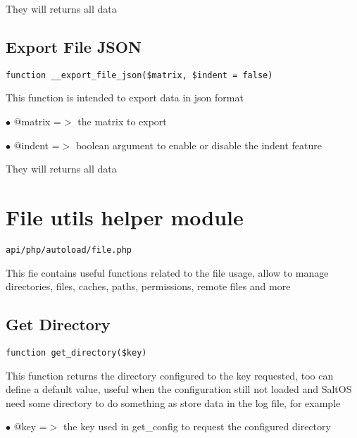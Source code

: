 \documentclass[a4paper]{book}
\begin{document}
They will returns all data

\hypertarget{toc126}{}
\subsection{Export File JSON}

\begin{lstlisting}
function __export_file_json($matrix, $indent = false)
\end{lstlisting}

This function is intended to export data in json format

\begin{compactitem}
\item[\color{myblue}$\bullet$] @matrix =$>$ the matrix to export
\item[\color{myblue}$\bullet$] @indent =$>$ boolean argument to enable or disable the indent feature
\end{compactitem}

They will returns all data

\hypertarget{toc127}{}
\section{File utils helper module}

\begin{lstlisting}
api/php/autoload/file.php
\end{lstlisting}

This fie contains useful functions related to the file usage, allow to manage directories, files,
caches, paths, permissions, remote files and more

\hypertarget{toc128}{}
\subsection{Get Directory}

\begin{lstlisting}
function get_directory($key)
\end{lstlisting}

This function returns the directory configured to the key requested, too can define a default
value, useful when the configuration still not loaded and SaltOS need some directory to do
something as store data in the log file, for example

\begin{compactitem}
\item[\color{myblue}$\bullet$] @key =$>$ the key used in get\_config to request the configured directory
\end{compactitem}
\end{document}
